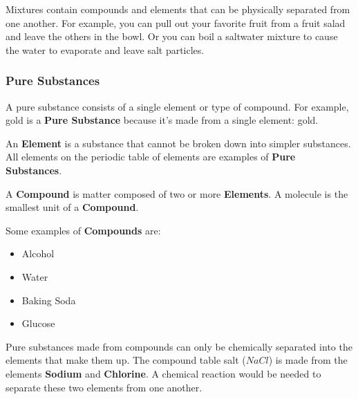 \begin{definition}
    Mixtures contain compounds and elements that can be physically separated
    from one another. For example, you can pull out your favorite fruit from a
    fruit salad and leave the others in the bowl. Or you can boil a saltwater
    mixture to cause the water to evaporate and leave salt particles.
\end{definition}

\subsubsection*{Pure Substances}

A pure substance consists of a single element or type of compound. For example,
gold is a \textbf{Pure Substance} because it's made from a single element:
gold.

\begin{definition}[Elements]
    An \textbf{Element} is a substance that cannot be broken down into simpler
    substances. All elements on the periodic table of elements are examples of
    \textbf{Pure Substances}.
\end{definition}

\begin{definition}[Compounds]
    A \textbf{Compound} is matter composed of two or more \textbf{Elements}. A
    molecule is the smallest unit of a \textbf{Compound}. 

    Some examples of \textbf{Compounds} are:
    
    \begin{itemize}
        \item Alcohol
        \item Water
        \item Baking Soda
        \item Glucose
    \end{itemize}
\end{definition}

\begin{definition}
    Pure substances made from compounds can only be chemically separated into
    the elements that make them up. The compound table salt ($NaCl$) is made
    from the elements \textbf{Sodium} and \textbf{Chlorine}. A chemical
    reaction would be needed to separate these two elements from one another.
\end{definition}

\newpage

